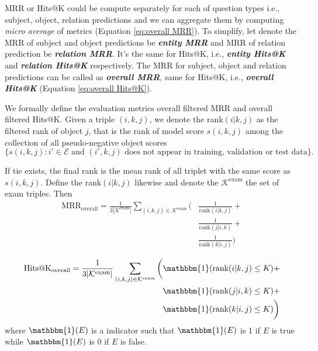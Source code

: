 MRR or Hits@K could be compute separately for each of question types i.e., subject, object, relation predictions and we can aggregate them by computing \textit{micro average} of metrics (Equation \ref{eq:overall MRR}). To simplify, let denote the MRR of subject and object predictions be \textit{\textbf{entity MRR}} and MRR of relation prediction be \textit{\textbf{relation MRR}}. It's the same for Hits@K, i.e., \textit{\textbf{entity Hits@K}} and \textit{\textbf{relation Hits@K}} respectively. The MRR for subject, object and relation predictions can be called as \textit{\textbf{overall MRR}}, same for Hits@K, i.e., \textit{\textbf{overall Hits@K}} (Equation \ref{eq:overall Hits@K}). 

We formally define the evaluation metrics overall filtered MRR and overall filtered Hits@K. Given a triple $(i,k,j)$, we denote the rank$(i|k,j)$ as the filtered rank of object $j$, that is the rank of model score $s(i,k,j)$ among the collection of all pseudo-negative object scores $$\{s(i,k,j): i' \in \mathcal{E} \text{ and } (i',k,j) \text{ does not appear in training, validation or test data} \}\text{.}$$

If tie exists, the final rank is the mean rank of all triplet with the same score as $s(i,k,j)$. Define the rank$(i|k,j)$ likewise and denote the $\mathcal{K}^{\text{exam}}$ the set of exam triples. Then
\begin{equation}
 \begin{split}
\label{eq:overall MRR}
    \text{MRR}_{\text{overall}} =\frac{1}{3|\mathcal{K}^{\text{exam}}|}
    \sum_{(i,k,j)\in\mathcal{K}^{\text{exam}}}  \bigg(
    & \frac{1}{\text{rank}(i|k,j)} + \\
    & \frac{1}{\text{rank}(j|i,k)} + \\
    & \frac{1}{\text{rank}(k|i,j)} \bigg) 
\end{split}
\end{equation}

\begin{equation}
\label{eq:overall Hits@K}
\begin{split}
    \text{Hits@K}_{\text{overall}} =
    \frac{1}{3|\mathcal{K}^{\text{exam}}|}
    \sum_{(i,k,j)\in\mathcal{K}^{\text{exam}}}
    \bigg(
    & \mathbbm{1}(\text{rank}(i|k,j) \leq K) + \\
    & \mathbbm{1}(\text{rank}(j|i,k) \leq K) + \\
    & \mathbbm{1}(\text{rank}(k|i,j) \leq K)
    \bigg) 
\end{split}
\end{equation}
\noindent where $\mathbbm{1}(E)$ is a indicator such that $\mathbbm{1}(E)$ is 1 if $E$ is true while $\mathbbm{1}(E)$ is 0 if $E$ is false.



